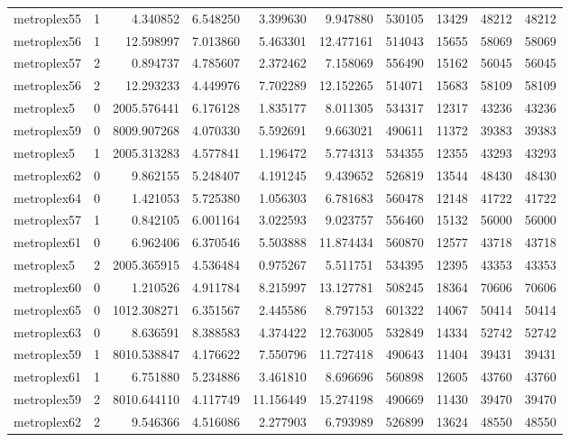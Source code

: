 \begin{longtable}{|l|r|r|r|r|r|r|r|r|r|}
metroplex55 & 1 & 4.340852 & 6.548250 & 3.399630 & 9.947880 & 530105 & 13429 & 48212 & 48212 \\
metroplex56 & 1 & 12.598997 & 7.013860 & 5.463301 & 12.477161 & 514043 & 15655 & 58069 & 58069 \\
metroplex57 & 2 & 0.894737 & 4.785607 & 2.372462 & 7.158069 & 556490 & 15162 & 56045 & 56045 \\
metroplex56 & 2 & 12.293233 & 4.449976 & 7.702289 & 12.152265 & 514071 & 15683 & 58109 & 58109 \\
metroplex5 & 0 & 2005.576441 & 6.176128 & 1.835177 & 8.011305 & 534317 & 12317 & 43236 & 43236 \\
metroplex59 & 0 & 8009.907268 & 4.070330 & 5.592691 & 9.663021 & 490611 & 11372 & 39383 & 39383 \\
metroplex5 & 1 & 2005.313283 & 4.577841 & 1.196472 & 5.774313 & 534355 & 12355 & 43293 & 43293 \\
metroplex62 & 0 & 9.862155 & 5.248407 & 4.191245 & 9.439652 & 526819 & 13544 & 48430 & 48430 \\
metroplex64 & 0 & 1.421053 & 5.725380 & 1.056303 & 6.781683 & 560478 & 12148 & 41722 & 41722 \\
metroplex57 & 1 & 0.842105 & 6.001164 & 3.022593 & 9.023757 & 556460 & 15132 & 56000 & 56000 \\
metroplex61 & 0 & 6.962406 & 6.370546 & 5.503888 & 11.874434 & 560870 & 12577 & 43718 & 43718 \\
metroplex5 & 2 & 2005.365915 & 4.536484 & 0.975267 & 5.511751 & 534395 & 12395 & 43353 & 43353 \\
metroplex60 & 0 & 1.210526 & 4.911784 & 8.215997 & 13.127781 & 508245 & 18364 & 70606 & 70606 \\
metroplex65 & 0 & 1012.308271 & 6.351567 & 2.445586 & 8.797153 & 601322 & 14067 & 50414 & 50414 \\
metroplex63 & 0 & 8.636591 & 8.388583 & 4.374422 & 12.763005 & 532849 & 14334 & 52742 & 52742 \\
metroplex59 & 1 & 8010.538847 & 4.176622 & 7.550796 & 11.727418 & 490643 & 11404 & 39431 & 39431 \\
metroplex61 & 1 & 6.751880 & 5.234886 & 3.461810 & 8.696696 & 560898 & 12605 & 43760 & 43760 \\
metroplex59 & 2 & 8010.644110 & 4.117749 & 11.156449 & 15.274198 & 490669 & 11430 & 39470 & 39470 \\
metroplex62 & 2 & 9.546366 & 4.516086 & 2.277903 & 6.793989 & 526899 & 13624 & 48550 & 48550 \\

\end{longtable}
